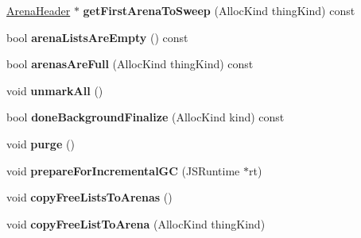 \begin{DoxyCompactItemize}
\item 
\hypertarget{structjs_1_1gc_1_1_arena_lists_a903efcae5dd683a40b7f0e223d129e72}{\hyperlink{structjs_1_1gc_1_1_arena_header}{Arena\-Header} $\ast$ {\bfseries get\-First\-Arena\-To\-Sweep} (Alloc\-Kind thing\-Kind) const }\label{structjs_1_1gc_1_1_arena_lists_a903efcae5dd683a40b7f0e223d129e72}

\item 
\hypertarget{structjs_1_1gc_1_1_arena_lists_af0e33cf7f43ad28f98f8894be6424617}{bool {\bfseries arena\-Lists\-Are\-Empty} () const }\label{structjs_1_1gc_1_1_arena_lists_af0e33cf7f43ad28f98f8894be6424617}

\item 
\hypertarget{structjs_1_1gc_1_1_arena_lists_a2c6b18253dbecdba1d815104f09ef392}{bool {\bfseries arenas\-Are\-Full} (Alloc\-Kind thing\-Kind) const }\label{structjs_1_1gc_1_1_arena_lists_a2c6b18253dbecdba1d815104f09ef392}

\item 
\hypertarget{structjs_1_1gc_1_1_arena_lists_af4feafe8906fd67277b428b51919550e}{void {\bfseries unmark\-All} ()}\label{structjs_1_1gc_1_1_arena_lists_af4feafe8906fd67277b428b51919550e}

\item 
\hypertarget{structjs_1_1gc_1_1_arena_lists_a7be86b2cc9624c3a2b519752372aaaa9}{bool {\bfseries done\-Background\-Finalize} (Alloc\-Kind kind) const }\label{structjs_1_1gc_1_1_arena_lists_a7be86b2cc9624c3a2b519752372aaaa9}

\item 
\hypertarget{structjs_1_1gc_1_1_arena_lists_abe9db02a56fd383692386ac2d1626f7d}{void {\bfseries purge} ()}\label{structjs_1_1gc_1_1_arena_lists_abe9db02a56fd383692386ac2d1626f7d}

\item 
\hypertarget{structjs_1_1gc_1_1_arena_lists_a871ebcefdb8e7b132425dba64672403d}{void {\bfseries prepare\-For\-Incremental\-G\-C} (J\-S\-Runtime $\ast$rt)}\label{structjs_1_1gc_1_1_arena_lists_a871ebcefdb8e7b132425dba64672403d}

\item 
\hypertarget{structjs_1_1gc_1_1_arena_lists_a0cba850c836757320f85a8b8b61766b8}{void {\bfseries copy\-Free\-Lists\-To\-Arenas} ()}\label{structjs_1_1gc_1_1_arena_lists_a0cba850c836757320f85a8b8b61766b8}

\item 
\hypertarget{structjs_1_1gc_1_1_arena_lists_af4da0e80177f24ec63e773e26b3fffb5}{void {\bfseries copy\-Free\-List\-To\-Arena} (Alloc\-Kind thing\-Kind)}\label{structjs_1_1gc_1_1_arena_lists_af4da0e80177f24ec63e773e26b3fffb5}


\end{DoxyCompactItemize}
